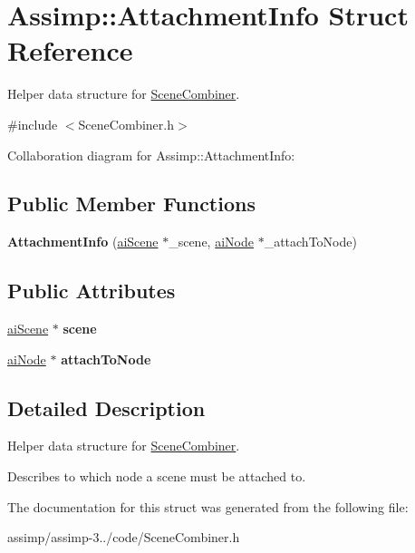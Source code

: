 \hypertarget{struct_assimp_1_1_attachment_info}{\section{Assimp\+:\+:Attachment\+Info Struct Reference}
\label{struct_assimp_1_1_attachment_info}
}


Helper data structure for \hyperlink{class_assimp_1_1_scene_combiner}{Scene\+Combiner}.  




{\ttfamily \#include $<$Scene\+Combiner.\+h$>$}



Collaboration diagram for Assimp\+:\+:Attachment\+Info\+:
\subsection*{Public Member Functions}
\begin{DoxyCompactItemize}
\item 
\hypertarget{struct_assimp_1_1_attachment_info_adcaaddd711aff0c20397036665a7f4ac}{{\bfseries Attachment\+Info} (\hyperlink{structai_scene}{ai\+Scene} $\ast$\+\_\+scene, \hyperlink{structai_node}{ai\+Node} $\ast$\+\_\+attach\+To\+Node)}\label{struct_assimp_1_1_attachment_info_adcaaddd711aff0c20397036665a7f4ac}

\end{DoxyCompactItemize}
\subsection*{Public Attributes}
\begin{DoxyCompactItemize}
\item 
\hypertarget{struct_assimp_1_1_attachment_info_a686b5dbdcf6eb6156b401f22349e2daa}{\hyperlink{structai_scene}{ai\+Scene} $\ast$ {\bfseries scene}}\label{struct_assimp_1_1_attachment_info_a686b5dbdcf6eb6156b401f22349e2daa}

\item 
\hypertarget{struct_assimp_1_1_attachment_info_a3bbce212f1e8427681a8a8ced25d866c}{\hyperlink{structai_node}{ai\+Node} $\ast$ {\bfseries attach\+To\+Node}}\label{struct_assimp_1_1_attachment_info_a3bbce212f1e8427681a8a8ced25d866c}

\end{DoxyCompactItemize}


\subsection{Detailed Description}
Helper data structure for \hyperlink{class_assimp_1_1_scene_combiner}{Scene\+Combiner}. 

Describes to which node a scene must be attached to. 

The documentation for this struct was generated from the following file\+:\begin{DoxyCompactItemize}
\item 
assimp/assimp-\/3../code/Scene\+Combiner.\+h\end{DoxyCompactItemize}
